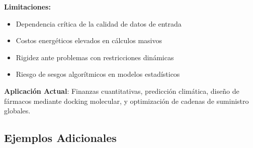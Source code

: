 \documentclass[14pt]{extarticle}
\begin{document}
  \textbf{Limitaciones:}
  \begin{itemize}
    \item Dependencia crítica de la calidad de datos de entrada
    \item Costos energéticos elevados en cálculos masivos
    \item Rigidez ante problemas con restricciones dinámicas
    \item Riesgo de sesgos algorítmicos en modelos estadísticos
  \end{itemize}

  \textbf{Aplicación Actual}: Finanzas cuantitativas, predicción climática, diseño de fármacos mediante docking molecular, y optimización de cadenas de suministro globales.

  \subsection*{Ejemplos Adicionales}
\end{document}
